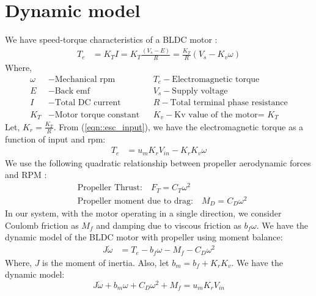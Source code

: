 \section{Dynamic model}


We have speed-torque characteristics of a BLDC motor \cite{crowder2019electric}:
\begin{align}
    T_e &= K_T I = K_T \frac{(V_s - E)}{R} = \frac{K_T}{R} (V_s - K_v \omega)
\end{align}
Where,
\begin{align*}
    \omega &- \text{Mechanical rpm} & &
    T_e      - \text{Electromagnetic torque}\\
    E        &- \text{Back emf} & &
    V_s      - \text{Supply voltage}\\
    I        &- \text{Total DC current}& &
    R        - \text{Total terminal phase resistance}\\
    K_T      &- \text{Motor torque constant} & &
    K_v      - \text{Kv value of the motor= $K_T$}
\end{align*}
Let, $K_r = \frac{K_T}{R}$.
From (\ref{eqn::esc_input}), we have the electromagnetic torque as a function
of input and rpm:
\begin{align}\label{eqn::Te}
    T_e &= u_m K_r V_{in} - K_r K_v \omega
\end{align}
We use the following quadratic relationship between propeller aerodynamic forces
and RPM \cite{pounds2010modelling}:
\begin{align}
    &\text{Propeller Thrust:}\quad
    F_T = C_{T} \omega^2\\
    &\text{Propeller moment due to drag:}\quad
    M_D = C_{D} \omega^2
\end{align}
In our system, with the motor operating in a single direction, we consider
Coulomb friction as $M_f$ and damping due to viscous friction as $b_f\omega$.
We have the dynamic model of the BLDC motor with propeller using moment balance:
\begin{align}
    J \dot \omega &= T_e - b_f \omega - M_f - C_D \omega^2
\end{align}
Where, $J$ is the moment of inertia. Also, let $b_m = b_f + K_rK_v$. We have the dynamic model:
\begin{equation}\label{eqn:dyn_mdl}
    J\dot \omega + b_m \omega + C_D \omega^2 + M_f = u_m K_r V_{in}
\end{equation}




